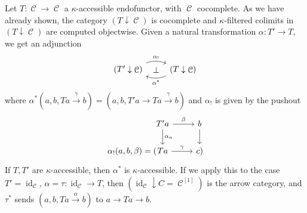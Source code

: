 \documentclass[a4paper,11pt,oneside,openany]{scrbook}
\newcommand{\from}{\colon}
\DeclareMathOperator{\C}{\mathcal{C}}
\DeclareMathOperator{\id}{id}
\theoremstyle{definition}
\theoremstyle{definition}
\begin{document}
Let $ T\from \C \to \C $ a $ \kappa $-accessible endofunctor, with $ \C $ cocomplete.
As we have already shown, the category $ (T \downarrow \C )$ is cocomplete and $ \kappa $-filtered colimits in $ (T\downarrow\C) $ are computed objectwise.
Given a natural transformation $ \alpha \from T' \to T $, we get an adjunction
\begin{displaymath}
    \begin{tikzcd}
	(T' \downarrow \C) \arrow[r, "\alpha_!", bend left=20]
	    \arrow[from=r, "\alpha^*", bend left=20]
	    \arrow[r, phantom, "\bot"]
	    & (T \downarrow \C)
    \end{tikzcd}
\end{displaymath}
where $ \alpha^*(a,b,Ta \xrightarrow{\gamma} b) = (a,b,T'a \to Ta \xrightarrow{\gamma} b) $
and $ \alpha_! $ is given by the pushout
\begin{displaymath}
    \begin{tikzcd}
	&[-3.3em]T'a \arrow[r,"\beta"]\arrow[d,"\alpha_a"]& b\arrow[d]\\
	\alpha_!(a,b,\beta)= (&	Ta \arrow[r, "\gamma"] & c)
    \end{tikzcd}
\end{displaymath}
If $ T,T' $ are $ \kappa $-accessible, then $ \alpha ^* $ is $ \kappa $-accessible.
If we apply this to the case $ T' = \id_{\C} $, $ \alpha=\tau\from \id_{\C} \to T $, then $ (\id_{\C} \downarrow C = \C ^{[1]}) $ is the arrow category, and
$ \tau^* $ sends $ (a,b,Ta \xrightarrow{\alpha}b) $ to $ a \to Ta \to b $.
\end{document}
